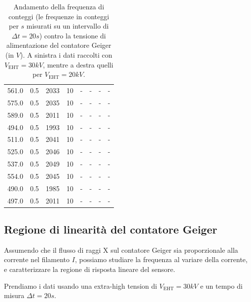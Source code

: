 \begin{table}[]
\begin{tabular}{cccc|cccc}
561.0 & 0.5 & 2033 & 10 & - & - & - & -\\
575.0 & 0.5 & 2035 & 10 & - & - & - & -\\
589.0 & 0.5 & 2011 & 10 & - & - & - & -\\
494.0 & 0.5 & 1993 & 10 & - & - & - & -\\
511.0 & 0.5 & 2041 & 10 & - & - & - & -\\
525.0 & 0.5 & 2046 & 10 & - & - & - & -\\
537.0 & 0.5 & 2049 & 10 & - & - & - & -\\
554.0 & 0.5 & 2045 & 10 & - & - & - & -\\
490.0 & 0.5 & 1985 & 10 & - & - & - & -\\
497.0 & 0.5 & 2011 & 10 & - & - & - & -\\
\end{tabular}
\caption{Andamento della frequenza di conteggi (le frequenze in conteggi per $ \unit{s} $ misurati su un intervallo di $ \Delta t = 20 \unit{s} $) contro la tensione di alimentazione del contatore Geiger (in $ \unit{V} $). A sinistra i dati raccolti con $ V_\text{EHT} = 30 \unit{kV} $, mentre a destra quelli per $ V_\text{EHT} = 20 \unit{kV} $.}
\label{tab:Vgeiger}
\end{table}

\subsection{Regione di linearità del contatore Geiger}

Assumendo che il flusso di raggi X sul contatore Geiger sia proporzionale alla corrente nel filamento $I$, possiamo studiare la frequenza al variare della corrente, e caratterizzare la regione di risposta lineare del sensore. 

Prendiamo i dati usando una extra-high tension di $ V_\text{EHT} = 30 \unit{kV} $ e un tempo di misura  $ \Delta t = 20 \unit{s} $.

